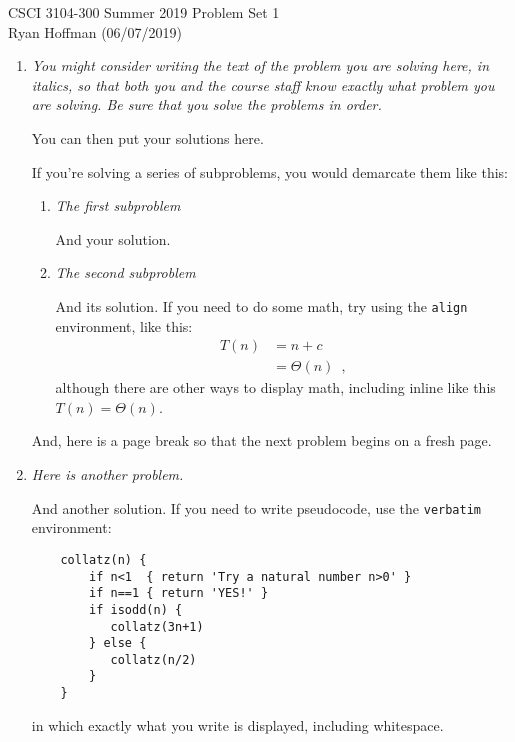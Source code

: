 \documentclass[12pt]{article}
\begin{document}
CSCI 3104-300 Summer 2019 \hfill Problem Set 1\\
Ryan Hoffman (06/07/2019)

\hrulefill

\begin{enumerate}

	\item	\textit{You might consider writing the text of the problem you are solving here, in italics, so that both you and the course staff know exactly what problem you are solving. Be sure that you solve the problems in order.}

	You can then put your solutions here.

	If you're solving a series of subproblems, you would demarcate them like this:
	\begin{enumerate}
	\item \textit{The first subproblem}

	And your solution.

	\item \textit{The second subproblem}

	And its solution. If you need to do some math, try using the {\tt align} environment, like this:
	\begin{align}
	T(n) & = n+c \nonumber \\
	& = \Theta(n) \enspace ,
	\end{align}
	although there are other ways to display math, including inline like this $T(n)=\Theta(n)$.

	\end{enumerate}

	And, here is a page break so that the next problem begins on a fresh page.

	\newpage

	\item \textit{Here is another problem.}

	And another solution. If you need to write pseudocode, use the {\tt verbatim} environment:
	\begin{verbatim}
	collatz(n) {
	    if n<1  { return 'Try a natural number n>0' }
	    if n==1 { return 'YES!' }
	    if isodd(n) {
	       collatz(3n+1)
	    } else {
	       collatz(n/2)
	    }
	}
	\end{verbatim}
	in which exactly what you write is displayed, including whitespace.


\end{enumerate}
\end{document}
